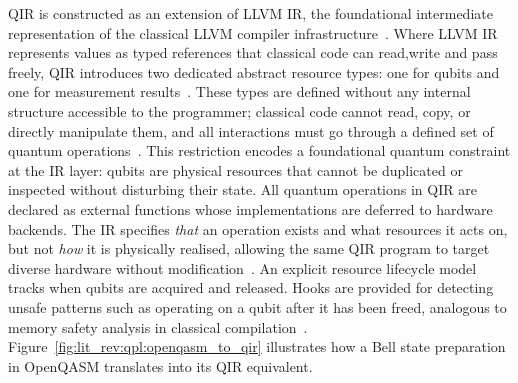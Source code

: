 QIR is constructed as an extension of LLVM IR, the foundational intermediate representation of the classical LLVM compiler infrastructure~\cite{scott2009plp}.
Where LLVM IR represents values as typed references that classical code can read,write and pass freely, QIR introduces two dedicated abstract resource types: one for qubits and one for measurement results~\cite{qiralliance_spec}.
These types are defined without any internal structure accessible to the programmer; classical code cannot read, copy, or directly manipulate them, and all interactions must go through a defined set of quantum operations~\cite{qiralliance_spec}.
This restriction encodes a foundational quantum constraint at the IR layer: qubits are physical resources that cannot be duplicated or inspected without disturbing their state.
All quantum operations in QIR are declared as external functions whose implementations are deferred to hardware backends.
The IR specifies \textit{that} an operation exists and what resources it acts on, but not \textit{how} it is physically realised, allowing the same QIR program to target diverse hardware without modification~\cite{qiralliance_spec}.
An explicit resource lifecycle model tracks when qubits are acquired and released.
Hooks are provided for detecting unsafe patterns such as operating on a qubit after it has been freed, analogous to memory safety analysis in classical compilation~\cite{qiralliance_spec, qirformalization2024}.
Figure~\ref{fig:lit_rev:qpl:openqasm_to_qir} illustrates how a Bell state preparation in OpenQASM translates into its QIR equivalent.

